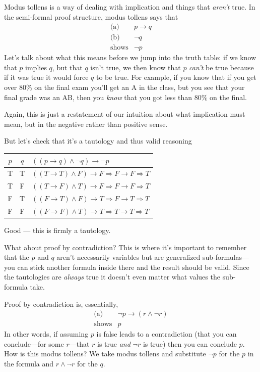 \documentclass[11pt]{article}
\begin{document}
Modus tollens is a way of dealing with implication and things that \emph{aren't} true. In the semi-formal proof structure, modus tollens says that
\[
  \begin{array}{rl}
    \text{(a)} & p \to q \\
    \text{(b)} & \lnot q \\
    \hline
    \text{shows} & \lnot p
  \end{array}
\]
Let's talk about what this means before we jump into the truth table: if we know that $p$ implies $q$, but that $q$ isn't true, we then know that $p$ \emph{can't} be true because if it was true it would force $q$ to be true. For example, if you know that if you get over 80\% on the final exam you'll get an A in the class, but you see that your final grade was an AB, then you \emph{know} that you got less than 80\% on the final.

Again, this is just a restatement of our intuition about what implication must mean, but in the negative rather than positive sense.

But let's check that it's a tautology and thus valid reasoning

\begin{center}
\begin{tabular}{ccl}
\toprule
$p$ & $q$ & $((p \to q) \wedge \lnot q) \to \lnot p$ \\
\midrule
T & T & $((T \to T) \wedge F) \to F \Longrightarrow F \to F \Longrightarrow T$ \\
T & F & $((T \to F) \wedge T) \to F \Longrightarrow F \to F \Longrightarrow T$ \\
F & T & $((F \to T) \wedge F) \to T \Longrightarrow F \to T \Longrightarrow T$ \\
F & F & $((F \to F) \wedge T) \to T \Longrightarrow T \to T \Longrightarrow T$ \\
\bottomrule
\end{tabular}
\end{center}

Good --- this is firmly a tautology.

What about proof by contradiction? This is where it's important to remember that the $p$ and $q$ aren't necessarily variables but are generalized sub-formulas---you can stick another formula inside there and the result should be valid. Since the tautologies are \emph{always} true it doesn't even matter what values the sub-formula take.

Proof by contradiction is, essentially,
\[
  \begin{array}{rl}
    \text{(a)} & \lnot p \to (r \wedge \lnot r) \\
    \hline
    \text{shows} & p
  \end{array}
\]
In other words, if assuming $p$ is false leads to a contradiction (that you can conclude---for some $r$---that $r$ is true \emph{and} $\lnot r$ is true) then you can conclude $p$. How is this modus tollens? We take modus tollens and substitute $\lnot p$ for the $p$ in the formula and $r \wedge \lnot r$ for the $q$.
\end{document}
